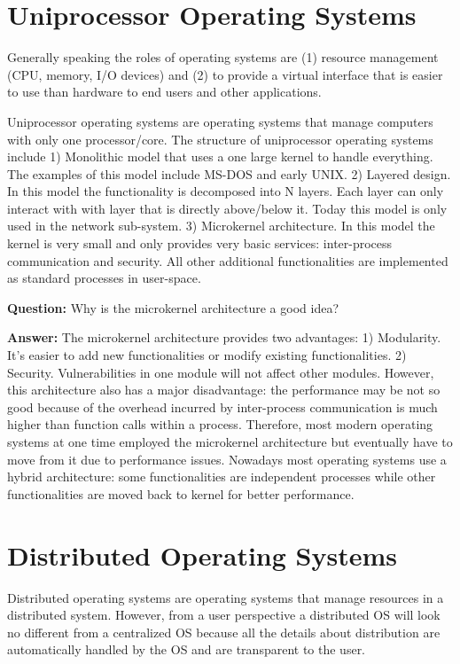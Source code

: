 \documentclass[twoside]{article}
\begin{document}
\section{Uniprocessor Operating Systems}
Generally speaking the roles of operating systems are (1) resource management (CPU, memory, I/O devices) and (2) to provide a virtual interface that is easier to use than hardware to end users and other applications.

Uniprocessor operating systems are operating systems that manage computers with only one processor/core. The structure of uniprocessor operating systems include 1) Monolithic model that uses a one large kernel to handle everything. The examples of this model include MS-DOS and early UNIX. 2) Layered design. In this model the functionality is decomposed into N layers. Each layer can only interact with with layer that is directly above/below it. Today this model is only used in the network sub-system. 3) Microkernel architecture. In this model the kernel is very small and only provides very basic services: inter-process communication and security. All other additional functionalities are implemented as standard processes in user-space.

\textbf{Question:} Why is the microkernel architecture a good idea?

\textbf{Answer:} The microkernel architecture provides two advantages: 1) Modularity. It's easier to add new functionalities or modify existing functionalities. 2) Security. Vulnerabilities in one module will not affect other modules. However, this architecture also has a major disadvantage: the performance may be not so good because of the overhead incurred by inter-process communication is much higher than function calls within a process. Therefore, most modern operating systems at one time employed the microkernel architecture but eventually have to move from it due to performance issues. Nowadays most operating systems use a hybrid architecture: some functionalities are independent processes while other functionalities are moved back to kernel for better performance. 

\section{Distributed Operating Systems}

Distributed operating systems are operating systems that manage resources in a distributed system. However, from a user perspective a distributed OS will look no different from a centralized OS because all the details about distribution are automatically handled by the OS and are transparent to the user.
\end{document}
